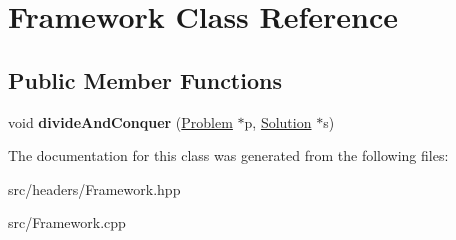 \hypertarget{classFramework}{\section{Framework Class Reference}
\label{classFramework}
}
\subsection*{Public Member Functions}
\begin{DoxyCompactItemize}
\item 
\hypertarget{classFramework_aaed170a2954c53ce3fc2818ada396ad4}{void {\bfseries divide\-And\-Conquer} (\hyperlink{classProblem}{Problem} $\ast$p, \hyperlink{classSolution}{Solution} $\ast$s)}\label{classFramework_aaed170a2954c53ce3fc2818ada396ad4}

\end{DoxyCompactItemize}


The documentation for this class was generated from the following files\-:\begin{DoxyCompactItemize}
\item 
src/headers/Framework.\-hpp\item 
src/Framework.\-cpp\end{DoxyCompactItemize}
